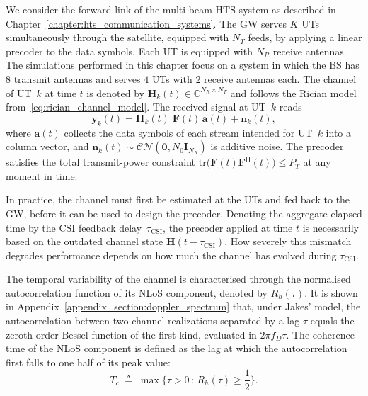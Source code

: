 We consider the forward link of the multi-beam \ac{HTS} system as described in Chapter~\ref{chapter:hts_communication_systems}. 
The \ac{GW} serves $K$ \acp{UT} simultaneously through the satellite, equipped with $N_T$ feeds, by applying a linear precoder to the data symbols.
Each \ac{UT} is equipped with $N_R$ receive antennas.
The simulations performed in this chapter focus on a system in which the \ac{BS} has $8$ transmit antennas and serves $4$ \acp{UT} with $2$ receive antennas each.
The channel of \ac{UT}~$k$ at time $t$ is denoted by $\mathbf{H}_k(t) \in \mathbb{C}^{N_R \times N_T}$ and follows the Rician model from~\eqref{eq:rician_channel_model}.
The received signal at \ac{UT}~$k$ reads
\begin{equation}
\label{eq:outdated_csi_received_signal}
    \mathbf{y}_k(t) = \mathbf{H}_k(t)\;\mathbf{F}(t)\,\mathbf{a}(t) + \mathbf{n}_k(t),
\end{equation}
where $\mathbf{a}(t)$ collects the data symbols of each stream intended for \ac{UT}~$k$ into a column vector, and $\mathbf{n}_k(t) \sim \mathcal{CN}(\mathbf{0}, N_0 \mathbf{I}_{N_R})$ is additive noise.
The precoder satisfies the total transmit-power constraint $\mathrm{tr}\big(\mathbf{F}(t)\mathbf{F}^{\mathsf{H}}(t)\big) \leq P_T$ at any moment in time.

In practice, the channel must first be estimated at the \acp{UT} and fed back to the \ac{GW}, before it can be used to design the precoder.
Denoting the aggregate elapsed time by the \ac{CSI} feedback delay~$\tau_{\mathrm{CSI}}$, the precoder applied at time $t$ is necessarily based on the outdated channel state $\mathbf{H}(t - \tau_{\mathrm{CSI}})$.
How severely this mismatch degrades performance depends on how much the channel has evolved during $\tau_{\mathrm{CSI}}$.

The temporal variability of the channel is characterised through the normalised autocorrelation function of its \ac{NLoS} component, denoted by $R_h(\tau)$.
It is shown in Appendix~\ref{appendix_section:doppler_spectrum} that, under Jakes' model, the autocorrelation between two channel realizations separated by a lag $\tau$ equals the zeroth-order Bessel function of the first kind, evaluated in $2\pi f_D \tau$.
The coherence time of the \ac{NLoS} component is defined as the lag at which the autocorrelation first falls to one half of its peak value:
\begin{equation}
\label{eq:coherence_time_def}
    T_c \;\triangleq\; \max\{\tau > 0 \,:\, R_h(\tau) \geq \frac{1}{2}\}.
\end{equation}

